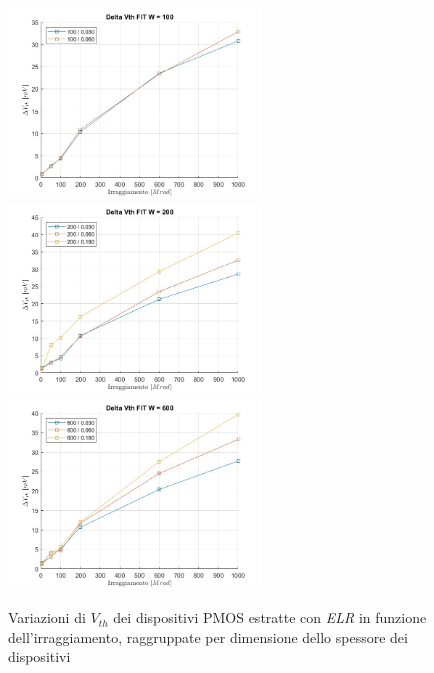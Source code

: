 \documentclass[12pt, letterpaper]{book}
\begin{document}
\begin{figure}[H]
  \centering
  \includegraphics[width=0.6\textwidth]{sovrapposizione-deltaVth-FIT-P100}
  \includegraphics[width=0.6\textwidth]{sovrapposizione-deltaVth-FIT-P200}
  \includegraphics[width=0.6\textwidth]{sovrapposizione-deltaVth-FIT-P600}
  \caption{Variazioni di $V_{th}$ dei dispositivi PMOS estratte con \emph{ELR} in funzione dell'irraggiamento, raggruppate per dimensione dello spessore dei dispositivi}
\end{figure}
\end{document}
